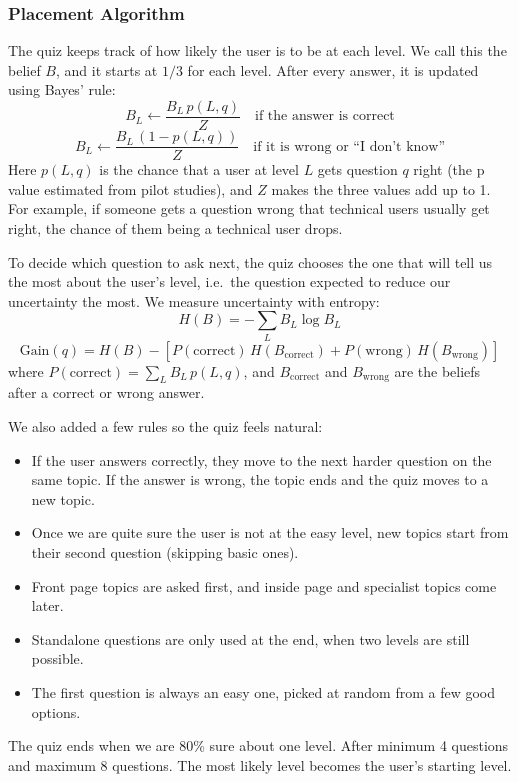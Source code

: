 \documentclass{FastFyp}
\begin{document}
\subsubsection{Placement Algorithm}
The quiz keeps track of how likely the user is to be at each level. We call this the belief $B$, and it starts at $1/3$ for each level. After every answer, it is updated using Bayes' rule:
\[
B_L \leftarrow \frac{B_L \, p(L,q)}{Z} \quad \mbox{if the answer is correct}
\]
\[
B_L \leftarrow \frac{B_L \, \left(1 - p(L,q)\right)}{Z} \quad \mbox{if it is wrong or ``I don't know''}
\]
Here $p(L,q)$ is the chance that a user at level $L$ gets question $q$ right (the p value estimated from pilot studies), and $Z$ makes the three values add up to 1. For example, if someone gets a question wrong that technical users usually get right, the chance of them being a technical user drops.

To decide which question to ask next, the quiz chooses the one that will tell us the most about the user's level, i.e.\ the question expected to reduce our uncertainty the most. We measure uncertainty with entropy:
\[
H(B) = -\sum_{L} B_L \log B_L
\]
\[
\mathrm{Gain}(q) = H(B) - \left[ P(\mathrm{correct})\, H(B_{\mathrm{correct}}) + P(\mathrm{wrong})\, H(B_{\mathrm{wrong}}) \right]
\]
where $P(\mathrm{correct}) = \sum_{L} B_L \, p(L,q)$, and $B_{\mathrm{correct}}$ and $B_{\mathrm{wrong}}$ are the beliefs after a correct or wrong answer.

We also added a few rules so the quiz feels natural:
\begin{itemize}
    \item If the user answers correctly, they move to the next harder question on the same topic. If the answer is wrong, the topic ends and the quiz moves to a new topic.
    \item Once we are quite sure the user is not at the easy level, new topics start from their second question (skipping basic ones).
    \item Front page topics are asked first, and inside page and specialist topics come later.
    \item Standalone questions are only used at the end, when two levels are still possible.
    \item The first question is always an easy one, picked at random from a few good options.
\end{itemize}
The quiz ends when we are 80\% sure about one level. After minimum 4 questions and maximum 8 questions. The most likely level becomes the user’s starting level.
\end{document}
